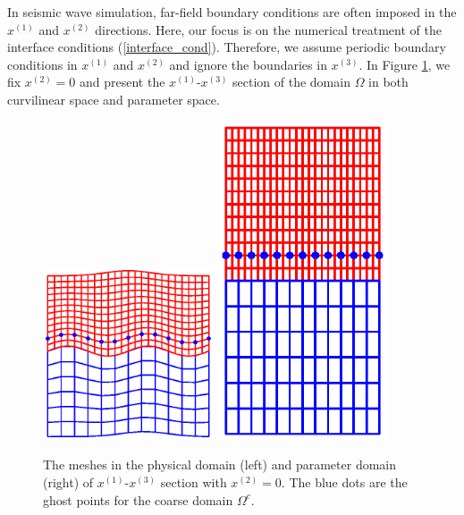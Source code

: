 In seismic wave simulation, far-field boundary conditions are often imposed in the $x^{(1)}$ and $x^{(2)}$ directions. Here, our focus is on the numerical treatment of the interface conditions (\ref{interface_cond}). Therefore, we assume periodic boundary conditions in $x^{(1)}$ and $x^{(2)}$ and ignore the boundaries in $x^{(3)}$. In Figure \ref{section_discretization}, we fix $x^{(2)} = 0$ and present the $x^{(1)}$-$x^{(3)}$ section of the domain $\Omega$ in both curvilinear space and parameter space.
\begin{figure}[htbp]
	\centering
	\includegraphics[width=0.45\textwidth,trim={1.0cm 2.0cm 1.0cm 1.8cm}, clip]{physical_section_discretization.eps}
	\includegraphics[width=0.45\textwidth,trim={1.0cm 2.0cm 1cm 1.8cm}, clip]{parameter_section_discretization.eps}
\caption{The meshes in the physical domain (left) and parameter domain (right) of $x^{(1)}$-$x^{(3)}$ section with $x^{(2)} = 0$. The blue dots are the ghost points for the coarse domain $\Omega^c$.}\label{section_discretization}
\end{figure}
